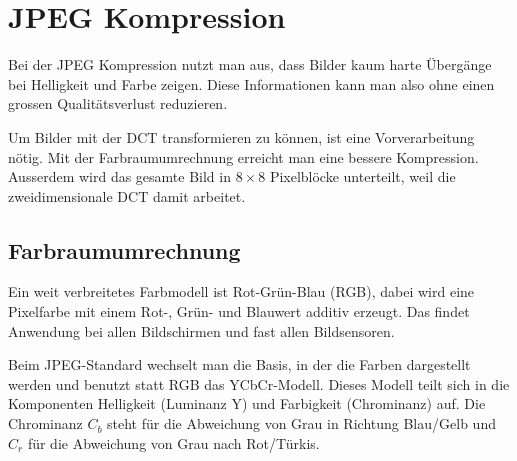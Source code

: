 %
%
%
%
\section{JPEG Kompression
\label{jpeg:section:kompjpeg}}
Bei der JPEG Kompression nutzt man aus, dass Bilder kaum harte Übergänge bei Helligkeit und Farbe zeigen.
Diese Informationen kann man also ohne einen grossen Qualitätsverlust reduzieren. 

Um Bilder mit der DCT transformieren zu können, ist eine Vorverarbeitung nötig. 
Mit der Farb\-raumumrechnung erreicht man eine bessere Kompression.
Ausserdem wird das gesamte Bild in \(8\times8\) Pixelblöcke unterteilt, weil die zweidimensionale DCT damit arbeitet.

\subsection{Farbraumumrechnung
\label{jpeg:subsection:farbraumumrechnung}}
Ein weit verbreitetes Farbmodell ist Rot-Grün-Blau (RGB), dabei wird eine Pixelfarbe mit einem Rot-, Grün- und Blauwert additiv erzeugt.
Das findet Anwendung bei allen Bildschirmen und fast allen Bildsensoren.

Beim JPEG-Standard wechselt man die Basis, in der die Farben dargestellt werden und benutzt statt RGB das YCbCr-Modell.
Dieses Modell teilt sich in die Komponenten Helligkeit (Luminanz Y) und Farbigkeit (Chrominanz) auf.
Die Chrominanz \(C_b\) steht für die Abweichung von Grau in Richtung Blau/Gelb und \(C_r\) für die Abweichung von Grau nach Rot/Türkis.

